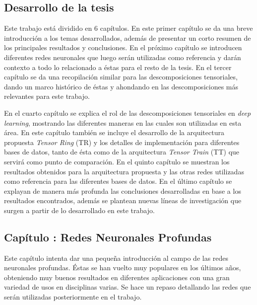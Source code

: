 \documentclass[spanish]{article}
\theoremstyle{definition}
\theoremstyle{remark}
\numberwithin{equation}{section}
\numberwithin{equation}{section} %
\begin{document}
\subsection{Desarrollo de la tesis}
Este trabajo está dividido en 6 capítulos. En este primer capítulo se da una breve introducción a los temas desarrollados, además de presentar un corto resumen de los principales resultados y conclusiones. En el próximo capítulo se introducen diferentes redes neuronales que luego serán utilizadas como referencia y darán contexto a todo lo relacionado a éstas para el resto de la tesis. En el tercer capítulo se da una recopilación similar para las descomposiciones tensoriales, dando un marco histórico de éstas y ahondando en las descomposiciones más relevantes para este trabajo.  
\par
En el cuarto capítulo se explica el rol de las descomposiciones tensoriales en \textit{deep learning}, mostrando las diferentes maneras en las cuales son utilizadas en esta área. En este capítulo también se incluye el desarrollo de la arquitectura propuesta  \textit{Tensor Ring} (TR) y los detalles de implementación para diferentes bases de datos, tanto de ésta como de la arquitectura \textit{Tensor Train} (TT) que servirá como punto de comparación. En el quinto capítulo  se muestran los resultados obtenidos para la arquitectura propuesta y las otras redes utilizadas como referencia para las diferentes bases de datos. En el último capítulo se explayan de manera más profunda las conclusiones desarrolladas en base a los resultados encontrados, además se plantean nuevas líneas de investigación que surgen a partir de lo desarrollado en este trabajo.    
\clearpage
\vspace*{0.25in}
\begin{center}
\begin{LARGE}
 \section{Capítulo \thesection: Redes Neuronales Profundas}
\end{LARGE}
\end{center}
\vspace*{0.25in}
\normalsize Este capítulo intenta dar una pequeña introducción al campo de las redes neuronales profundas. Éstas se han vuelto muy populares en los últimos años, obteniendo muy buenos resultados en diferentes aplicaciones con una gran variedad de usos en disciplinas varias. Se hace un repaso detallando las redes que serán utilizadas posteriormente en el trabajo.   
\par
\end{document}
